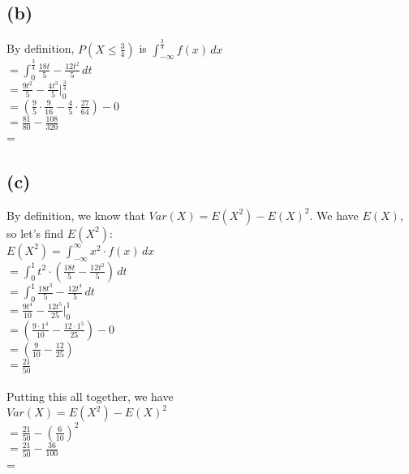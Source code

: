 \documentclass{article}
\begin{document}
{\subsection*{(b)}
By definition, $P(X \leq \frac{3}{4})$ is $\int_{-\infty}^{\frac{3}{4}} f(x) \, dx$ \\ 
$= \int_{0}^{\frac{3}{4}} \frac{18t}{5} - \frac{12t^2}{5} \, dt$ \\ 
$= \frac{9t^2}{5} - \frac{4t^3}{5} |_{0}^{\frac{3}{4}}$ \\ 
$= (\frac{9}{5} \cdot \frac{9}{16} - \frac{4}{5} \cdot \frac{27}{64}) - 0$ \\ 
$= \frac{81}{80} - \frac{108}{320}$ \\ 
= 

\subsection*{(c)}
By definition, we know that $Var(X) = E(X^2) - E(X)^2$. We have $E(X)$, so let's find $E(X^2)$: \\ 
$E(X^2) = \int_{-\infty}^{\infty} x^2 \cdot f(x) \,dx$ \\ 
$= \int_{0}^{1} t^2 \cdot (\frac{18t}{5} - \frac{12t^2}{5}) \,dt$ \\ 
$= \int_{0}^{1} \frac{18t^3}{5} - \frac{12t^4}{5} \,dt$ \\ 
$= \frac{9t^4}{10} - \frac{12t^5}{25} |_{0}^{1}$ \\ 
$= (\frac{9 \cdot 1^4}{10} - \frac{12 \cdot 1^5}{25}) - 0$ \\ 
$= (\frac{9}{10} - \frac{12}{25})$ \\ 
$= \frac{21}{50}$ \\ \\ 
Putting this all together, we have \\ 
$Var(X) = E(X^2) - E(X)^2$ \\
$= \frac{21}{50} - (\frac{6}{10})^2$ \\
$= \frac{21}{50} - \frac{36}{100}$ \\
= 

}
\end{document}
